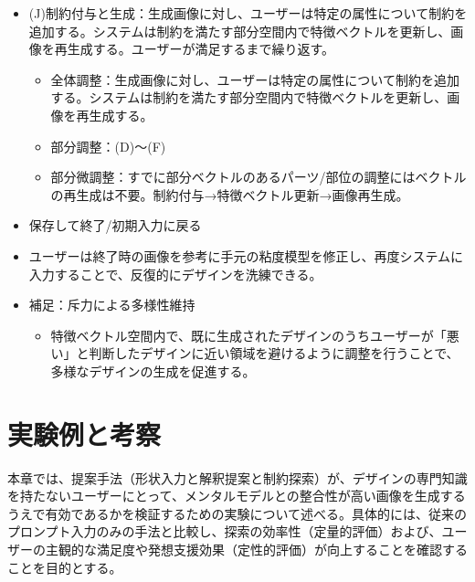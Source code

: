 \documentclass[dvipdfmx]{jlreq}
\begin{document}
\begin{itemize}
  \item (J)制約付与と生成：生成画像に対し、ユーザーは特定の属性について制約を追加する。システムは制約を満たす部分空間内で特徴ベクトルを更新し、画像を再生成する。ユーザーが満足するまで繰り返す。
  \begin{itemize}
    \item 全体調整：生成画像に対し、ユーザーは特定の属性について制約を追加する。システムは制約を満たす部分空間内で特徴ベクトルを更新し、画像を再生成する。
    \item 部分調整：(D)〜(F)
    \item 部分微調整：すでに部分ベクトルのあるパーツ/部位の調整にはベクトルの再生成は不要。制約付与→特徴ベクトル更新→画像再生成。
  \end{itemize}
  \item 保存して終了/初期入力に戻る
  \item ユーザーは終了時の画像を参考に手元の粘度模型を修正し、再度システムに入力することで、反復的にデザインを洗練できる。
  \item 補足：斥力による多様性維持
  \begin{itemize}
    \item 特徴ベクトル空間内で、既に生成されたデザインのうちユーザーが「悪い」と判断したデザインに近い領域を避けるように調整を行うことで、多様なデザインの生成を促進する。
  \end{itemize}
\end{itemize}



\section{実験例と考察}
本章では、提案手法（形状入力と解釈提案と制約探索）が、デザインの専門知識を持たないユーザーにとって、メンタルモデルとの整合性が高い画像を生成するうえで有効であるかを検証するための実験について述べる。具体的には、従来のプロンプト入力のみの手法と比較し、探索の効率性（定量的評価）および、ユーザーの主観的な満足度や発想支援効果（定性的評価）が向上することを確認することを目的とする。
\end{document}
